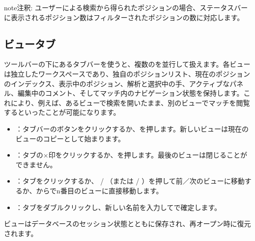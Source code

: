 \documentclass[letterpaper,10pt,dvipdfmx]{sphinxmanual}
\begin{document}
\begin{sphinxadmonition}{note}{注釈:}
\sphinxAtStartPar
ユーザーによる検索から得られたポジションの場合、ステータスバーに表示されるポジション数はフィルターされたポジションの数に対応します。
\end{sphinxadmonition}


\subsection{ビュータブ}
\label{\detokenize{manuel:onglets-de-vues}}\label{\detokenize{manuel:onglets-vues}}
\sphinxAtStartPar
ツールバーの下にあるタブバーを使うと、複数のを並行して扱えます。各ビューは独立したワークスペースであり、独自のポジションリスト、現在のポジションのインデックス、表示中のポジション、解析と選択中の手、アクティブなパネル、編集中のコメント、そしてマッチ内のナビゲーション状態を保持します。これにより、例えば、あるビューで検索を開いたまま、別のビューでマッチを閲覧するといったことが可能になります。
\begin{itemize}
\item {} 
\sphinxAtStartPar
{}：タブバーの\sphinxstyleemphasis{+}ボタンをクリックするか、を押します。新しいビューは現在のビューのコピーとして始まります。

\item {} 
\sphinxAtStartPar
{}：タブの×印をクリックするか、を押します。最後のビューは閉じることができません。

\item {} 
\sphinxAtStartPar
{}：タブをクリックするか、 / （または / ）を押して前／次のビューに移動するか、からでn番目のビューに直接移動します。

\item {} 
\sphinxAtStartPar
{}：タブをダブルクリックし、新しい名前を入力してで確定します。

\end{itemize}

\sphinxAtStartPar
ビューはデータベースのセッション状態とともに保存され、再オープン時に復元されます。
\end{document}
